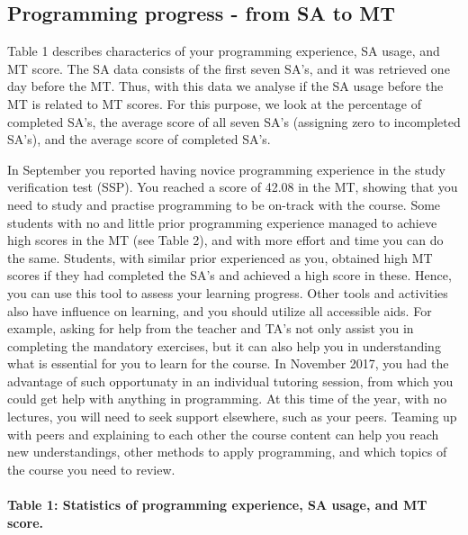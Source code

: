 \documentclass[]{article}
\let\oldparagraph\paragraph
\renewcommand{\paragraph}[1]{\oldparagraph{#1}\mbox{}}
\begin{document}
\subsection{Programming progress - from SA to
MT}\label{programming-progress---from-sa-to-mt}

Table 1 describes characterics of your programming experience, SA usage,
and MT score. The SA data consists of the first seven SA's, and it was
retrieved one day before the MT. Thus, with this data we analyse if the
SA usage before the MT is related to MT scores. For this purpose, we
look at the percentage of completed SA's, the average score of all seven
SA's (assigning zero to incompleted SA's), and the average score of
completed SA's.

In September you reported having novice programming experience in the
study verification test (SSP). You reached a score of 42.08 in the MT,
showing that you need to study and practise programming to be on-track
with the course. Some students with no and little prior programming
experience managed to achieve high scores in the MT (see Table 2), and
with more effort and time you can do the same. Students, with similar
prior experienced as you, obtained high MT scores if they had completed
the SA's and achieved a high score in these. Hence, you can use this
tool to assess your learning progress. Other tools and activities also
have influence on learning, and you should utilize all accessible aids.
For example, asking for help from the teacher and TA's not only assist
you in completing the mandatory exercises, but it can also help you in
understanding what is essential for you to learn for the course. In
November 2017, you had the advantage of such opportunaty in an
individual tutoring session, from which you could get help with anything
in programming. At this time of the year, with no lectures, you will
need to seek support elsewhere, such as your peers. Teaming up with
peers and explaining to each other the course content can help you reach
new understandings, other methods to apply programming, and which topics
of the course you need to review.

\paragraph{Table 1: Statistics of programming experience, SA usage, and
MT
score.}\label{table-1-statistics-of-programming-experience-sa-usage-and-mt-score.}
\end{document}
